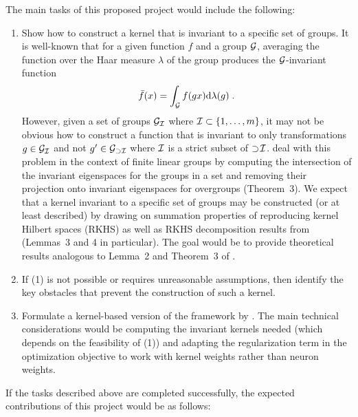 The main tasks of this proposed project would include the following:
\begin{enumerate}

\item
Show how to construct a kernel that is invariant to a specific set of groups. It is well-known that for a given function $f$ and a group $\mathcal{G}$, averaging the function over the Haar measure $\lambda$ of the group produces the $\mathcal{G}$-invariant function
\[
\bar{f}(x) = \int_{\mathcal{G}} f(gx)\mathrm{d}\lambda(g)\;.
\]
However, given a set of groups $\mathcal{G}_{\mathcal{I}}$ where $\mathcal{I}\subset\{1,\ldots,m\}$, it may not be obvious how to construct a function that is invariant to only transformations $g\in\mathcal{G}_{\mathcal{I}}$ and not $g'\in\mathcal{G}_{\supset\mathcal{I}}$ where $\mathcal{I}$ is a strict subset of $\supset\!\mathcal{I}$. \textcite{Mouli:2021} deal with this problem in the context of finite linear groups by computing the intersection of the invariant eigenspaces for the groups in a set and removing their projection onto invariant eigenspaces for overgroups (Theorem~3). We expect that a kernel invariant to a specific set of groups may be constructed (or at least described) by drawing on summation properties of reproducing kernel Hilbert spaces (RKHS) as well as RKHS decomposition results from \parencite{Elesedy:2021} (Lemmas~3 and 4 in particular). The goal would be to provide theoretical results analogous to Lemma~2 and Theorem~3 of \parencite{Mouli:2021}.

\item
If (1) is not possible or requires unreasonable assumptions, then identify the key obstacles that prevent the construction of such a kernel.

\item
Formulate a kernel-based version of the framework by \citeauthor{Mouli:2021}. The main technical considerations would be computing the invariant kernels needed (which depends on the feasibility of (1)) and adapting the regularization term in the optimization objective to work with kernel weights rather than neuron weights.

\end{enumerate}

If the tasks described above are completed successfully, the expected contributions of this project would be as follows:

